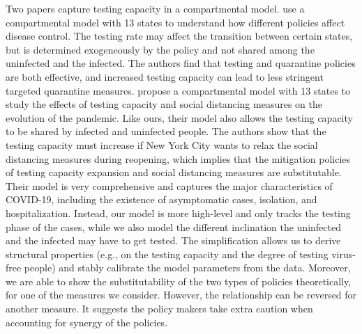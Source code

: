 \documentclass[nonblindrev, copyedit]{informs3a}
\newcounter{prop}[chapter]
\begin{document}
Two papers capture testing capacity in a compartmental model. \citet{berger2020seir} use a compartmental model with 13 states to understand how different policies affect disease control.
The testing rate may affect the transition between certain states, but is determined exogeneously by the policy and not shared among the uninfected and the infected.
The authors find that testing and quarantine policies are both effective, and increased testing capacity can lead to less stringent targeted quarantine measures.
\citet{housni2020can} propose a compartmental model with 13 states to study the effects of testing capacity and social distancing measures on the evolution of the pandemic.
Like ours, their model also allows the testing capacity to be shared by infected and uninfected people.
The authors show that the testing capacity must increase if New York City wants to relax the social distancing measures during reopening, which implies that the mitigation policies of testing capacity expansion and social distancing measures are substitutable.
Their model is very comprehensive and captures the major characteristics of COVID-19, including  the existence of asymptomatic cases, isolation, and hospitalization.
Instead, our model is more high-level and only tracks the testing phase of the cases, while we also model the different inclination the uninfected and the infected may have to get tested.
The simplification allows us to derive structural properties (e.g., on the testing capacity and the degree of testing virus-free people) and stably calibrate the model parameters from the data.
Moreover, we are able to show the substitutability of the two types of policies theoretically, for one of the measures we consider.
However, the relationship can be reversed for another measure.
It suggests the policy makers take extra caution when accounting for synergy of the policies.

\end{document}
